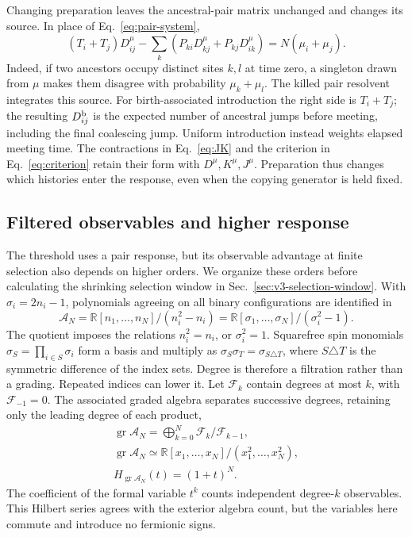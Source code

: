 \documentclass[aps,pre,reprint,amsmath,amssymb,longbibliography]{revtex4-2}
\newcommand{\gr}{\operatorname{gr}}
\begin{document}
Changing preparation leaves the ancestral-pair matrix unchanged and
changes its source. In place of Eq.~\eqref{eq:pair-system},
\begin{equation}
 (T_i+T_j)D_{ij}^{\mu}
 -\sum_k(P_{ki}D_{kj}^{\mu}+P_{kj}D_{ik}^{\mu})
 =N(\mu_i+\mu_j).
 \label{eq:v7-pair-preparation}
\end{equation}
Indeed, if two ancestors occupy distinct sites $k,l$ at time zero,
a singleton drawn from $\mu$ makes them disagree with probability
$\mu_k+\mu_l$. The killed pair resolvent integrates this source.
For birth-associated introduction the right side is $T_i+T_j$;
the resulting $D_{ij}^{\rm b}$ is the expected number of ancestral
jumps before meeting, including the final coalescing jump. Uniform
introduction instead weights elapsed meeting time. The contractions
in Eq.~\eqref{eq:JK} and the criterion in Eq.~\eqref{eq:criterion}
retain their form with $D^{\mu},K^{\mu},J^{\mu}$. Preparation thus
changes which histories enter the response, even when the copying
generator is held fixed.


\subsection{Filtered observables and higher response}
\label{sec:v4-observable-algebra}
The threshold uses a pair response, but its observable advantage at
finite selection also depends on higher orders. We organize these
orders before calculating the shrinking selection window in
Sec.~\ref{sec:v3-selection-window}. With $\sigma_i=2n_i-1$,
polynomials agreeing on all binary configurations are identified in
\begin{equation}
 \mathscr A_N=\mathbb R[n_1,\ldots,n_N]/(n_i^2-n_i)
 =\mathbb R[\sigma_1,\ldots,\sigma_N]/(\sigma_i^2-1).
 \label{eq:v4-boolean}
\end{equation}
The quotient imposes the relations $n_i^2=n_i$, or $\sigma_i^2=1$.
Squarefree spin monomials $\sigma_S=\prod_{i\in S}\sigma_i$ form a
basis and multiply as $\sigma_S\sigma_T=\sigma_{S\triangle T}$,
where $S\triangle T$ is the symmetric difference of the index sets.
Degree is therefore a filtration rather than a grading.  Repeated indices
can lower it. Let $\mathscr F_k$ contain degrees at most $k$, with
$\mathscr F_{-1}=0$. The associated graded algebra separates successive
degrees, retaining only the leading degree of each product,
\begin{equation}
 \begin{gathered}
 \gr\mathscr A_N=\bigoplus_{k=0}^N\mathscr F_k/\mathscr F_{k-1},\\
 \gr\mathscr A_N\simeq
 \mathbb R[x_1,\ldots,x_N]/(x_1^2,\ldots,x_N^2),\\
 H_{\gr\mathscr A_N}(t)=(1+t)^N.
 \end{gathered}
 \label{eq:v4-hilbert-full}
\end{equation}
The coefficient of the formal variable $t^k$ counts independent
degree-$k$ observables. This Hilbert series agrees with the exterior
algebra count, but the variables here commute and introduce no fermionic
signs.
\end{document}
